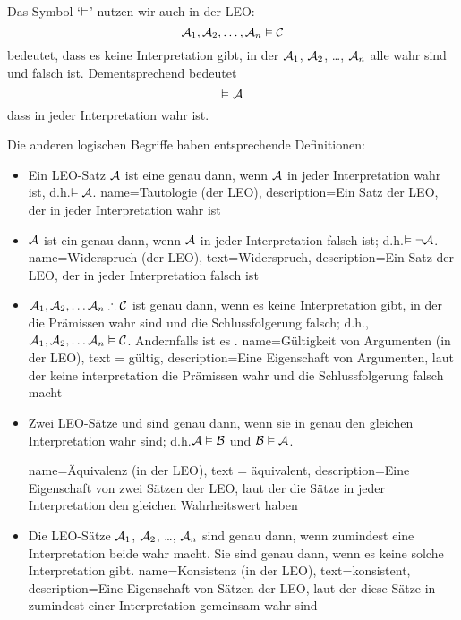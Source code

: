 Das Symbol `$\vDash$' nutzen wir auch in der LEO:
	$$\mathcal{A}_1, \mathcal{A}_2, \ldots, \mathcal{A}_n \vDash\mathcal{C}$$
bedeutet, dass es keine Interpretation gibt, in der $\mathcal{A}_1$, $\mathcal{A}_2$, \dots, $\mathcal{A}_n$ alle wahr sind und  falsch ist. Dementsprechend bedeutet
	$$\vDash\mathcal{A}$$
dass  in jeder Interpretation wahr ist.

Die anderen logischen Begriffe haben entsprechende Definitionen:

\begin{itemize}
\item Ein LEO-Satz $\mathcal{A}$ ist eine  genau dann, wenn $\mathcal{A}$ in jeder Interpretation wahr ist, d.h.\@ $\vDash\mathcal{A}$.
{
name=Tautologie (der LEO),
description={Ein \gls{Satz der LEO}, der in jeder \gls{Interpretation} wahr ist}
}

\item $\mathcal{A}$ ist ein  genau dann, wenn $\mathcal{A}$ in jeder Interpretation falsch ist; d.h.\@ $\vDash\neg\mathcal{A}$.
{
  name=Widerspruch (der LEO),
  text=Widerspruch,
description={Ein \gls{Satz der LEO}, der in jeder \gls{Interpretation} falsch ist}
}
  
\item $\metav{A}_1, \metav{A}_2, \ldots \metav{A}_n \therefore \metav{C}$ ist  genau dann, wenn es keine Interpretation gibt, in der die Prämissen wahr sind und die Schlussfolgerung falsch; d.h.\@, $\mathcal{A}_1,\mathcal{A}_2,\ldots \mathcal{A}_n \vDash\mathcal{C}$. Andernfalls ist es .
{
  name=Gültigkeit von Argumenten (in der LEO),
  text = gültig,
description={Eine Eigenschaft von Argumenten, laut der keine \gls{interpretation} die Prämissen wahr und die Schlussfolgerung falsch macht}
}

\item Zwei LEO-Sätze  und  sind  genau dann, wenn sie in genau den gleichen Interpretation wahr sind; d.h.\@ $\mathcal{A}\vDash\mathcal{B}$ und $\mathcal{B}\vDash\mathcal{A}$.

{
  name=Äquivalenz (in der LEO),
  text = äquivalent,
description={Eine Eigenschaft von zwei Sätzen der LEO, laut der die Sätze in jeder \gls{Interpretation} den gleichen Wahrheitswert haben}
}

\item Die LEO-Sätze $\mathcal{A}_1$, $\mathcal{A}_2$, \dots, $\mathcal{A}_n$ sind  genau dann, wenn zumindest eine Interpretation beide wahr macht. Sie sind  genau dann, wenn es keine solche Interpretation gibt.
{
  name=Konsistenz (in der LEO),
  text=konsistent,
description={Eine Eigenschaft von Sätzen der LEO, laut der diese Sätze in zumindest einer \gls{Interpretation} gemeinsam wahr sind}
}
\end{itemize}

